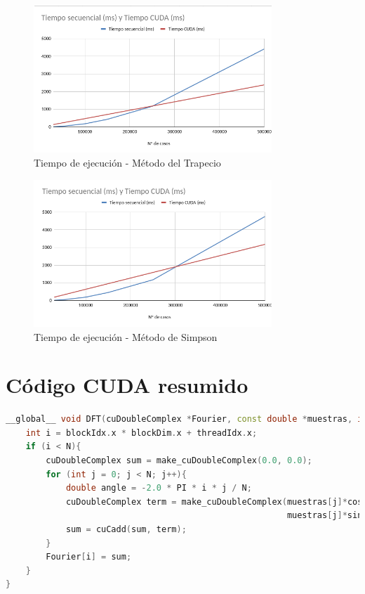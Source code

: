 \documentclass[12pt]{article}
\begin{document}
\begin{figure}[h]
    \centering
    \includegraphics[width=0.8\textwidth]{captura3.png}
    \caption{Tiempo de ejecución - Método del Trapecio}
\end{figure}

\begin{figure}[h]
    \centering
    \includegraphics[width=0.8\textwidth]{captura4.png}
    \caption{Tiempo de ejecución - Método de Simpson}
\end{figure}

\newpage

\section*{Código CUDA resumido}

\begin{lstlisting}[language=C++, basicstyle=\ttfamily\small, frame=single]
__global__ void DFT(cuDoubleComplex *Fourier, const double *muestras, int N){
    int i = blockIdx.x * blockDim.x + threadIdx.x;
    if (i < N){
        cuDoubleComplex sum = make_cuDoubleComplex(0.0, 0.0);
        for (int j = 0; j < N; j++){
            double angle = -2.0 * PI * i * j / N;
            cuDoubleComplex term = make_cuDoubleComplex(muestras[j]*cos(angle),
                                                        muestras[j]*sin(angle));
            sum = cuCadd(sum, term);
        }
        Fourier[i] = sum;
    }
}
\end{lstlisting}
\end{document}
